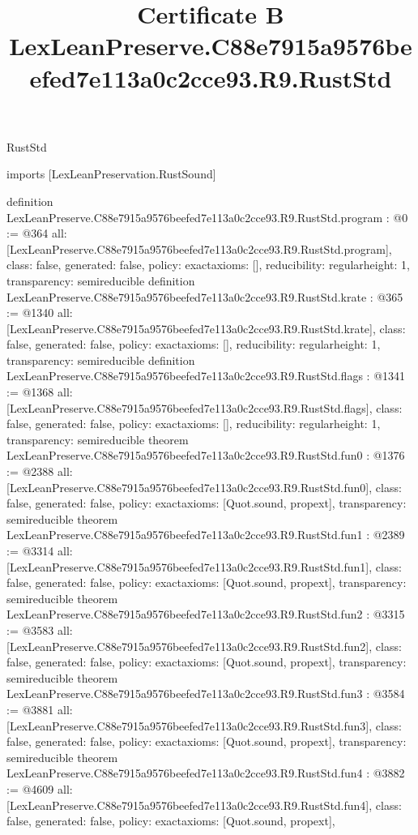 \begin{lexlean}{RustStd}
\title{Certificate B LexLeanPreserve.C88e7915a9576beefed7e113a0c2cce93.R9.RustStd}
\begin{coremodule}
imports [LexLeanPreservation.RustSound]

definition LexLeanPreserve.C88e7915a9576beefed7e113a0c2cce93.R9.RustStd.program : @0 := @364 {
  all: [LexLeanPreserve.C88e7915a9576beefed7e113a0c2cce93.R9.RustStd.program],
  class: false,
  generated: false,
  policy: exact{axioms: []},
  reducibility: regular{height: 1},
  transparency: semireducible
}
definition LexLeanPreserve.C88e7915a9576beefed7e113a0c2cce93.R9.RustStd.krate : @365 := @1340 {
  all: [LexLeanPreserve.C88e7915a9576beefed7e113a0c2cce93.R9.RustStd.krate],
  class: false,
  generated: false,
  policy: exact{axioms: []},
  reducibility: regular{height: 1},
  transparency: semireducible
}
definition LexLeanPreserve.C88e7915a9576beefed7e113a0c2cce93.R9.RustStd.flags : @1341 := @1368 {
  all: [LexLeanPreserve.C88e7915a9576beefed7e113a0c2cce93.R9.RustStd.flags],
  class: false,
  generated: false,
  policy: exact{axioms: []},
  reducibility: regular{height: 1},
  transparency: semireducible
}
theorem LexLeanPreserve.C88e7915a9576beefed7e113a0c2cce93.R9.RustStd.fun0 : @1376 := @2388 {
  all: [LexLeanPreserve.C88e7915a9576beefed7e113a0c2cce93.R9.RustStd.fun0],
  class: false,
  generated: false,
  policy: exact{axioms: [Quot.sound, propext]},
  transparency: semireducible
}
theorem LexLeanPreserve.C88e7915a9576beefed7e113a0c2cce93.R9.RustStd.fun1 : @2389 := @3314 {
  all: [LexLeanPreserve.C88e7915a9576beefed7e113a0c2cce93.R9.RustStd.fun1],
  class: false,
  generated: false,
  policy: exact{axioms: [Quot.sound, propext]},
  transparency: semireducible
}
theorem LexLeanPreserve.C88e7915a9576beefed7e113a0c2cce93.R9.RustStd.fun2 : @3315 := @3583 {
  all: [LexLeanPreserve.C88e7915a9576beefed7e113a0c2cce93.R9.RustStd.fun2],
  class: false,
  generated: false,
  policy: exact{axioms: [Quot.sound, propext]},
  transparency: semireducible
}
theorem LexLeanPreserve.C88e7915a9576beefed7e113a0c2cce93.R9.RustStd.fun3 : @3584 := @3881 {
  all: [LexLeanPreserve.C88e7915a9576beefed7e113a0c2cce93.R9.RustStd.fun3],
  class: false,
  generated: false,
  policy: exact{axioms: [Quot.sound, propext]},
  transparency: semireducible
}
theorem LexLeanPreserve.C88e7915a9576beefed7e113a0c2cce93.R9.RustStd.fun4 : @3882 := @4609 {
  all: [LexLeanPreserve.C88e7915a9576beefed7e113a0c2cce93.R9.RustStd.fun4],
  class: false,
  generated: false,
  policy: exact{axioms: [Quot.sound, propext]},
}
\end{coremodule}
\end{lexlean}
